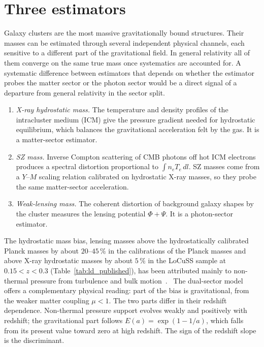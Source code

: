\section{Three estimators}\label{sec:tw_estimators}
Galaxy clusters are the most massive gravitationally bound structures. Their masses can be estimated through several independent physical channels,
each sensitive to a different part of the gravitational field. In general relativity all of them converge on the same true mass once systematics are
accounted for. A systematic difference between estimators that depends on whether the estimator probes the matter sector or the photon sector would be a
direct signal of a departure from general relativity in the sector split. \interp
\begin{enumerate}
\item \emph{X-ray hydrostatic mass.} The temperature and density profiles of the intracluster medium (ICM) give the pressure gradient needed for
hydrostatic equilibrium, which balances the gravitational acceleration felt by the gas. It is a matter-sector estimator.
\item \emph{SZ mass.} Inverse Compton scattering of CMB photons off hot ICM electrons produces a spectral distortion proportional to
$\int n_eT_e\,dl$. SZ masses come from a $Y$--$M$ scaling relation calibrated on hydrostatic X-ray masses, so they probe the same matter-sector
acceleration.
\item \emph{Weak-lensing mass.} The coherent distortion of background galaxy shapes by the cluster measures the lensing potential $\Phi+\Psi$. It is a
photon-sector estimator.
\end{enumerate}
The hydrostatic mass bias, lensing masses above the hydrostatically calibrated Planck masses by about $20$--$45\,\%$ in the
calibrations of the Planck masses and above X-ray hydrostatic masses by about $5\,\%$ in the LoCuSS sample at $0.15<z<0.3$ (Table~\ref{tab:ld_published}), has been attributed mainly to non-thermal pressure from turbulence and bulk
motion~\cite{Nagai2007Xray,Nelson2014}. \observed\ The dual-sector model offers a complementary physical reading: part of the bias is gravitational,
from the weaker matter coupling $\mu<1$. The two parts differ in their redshift dependence. Non-thermal pressure support evolves weakly and positively
with redshift; the gravitational part follows $E(a)=\exp(1-1/a)$, which falls from its present value toward zero at high redshift. The sign of the
redshift slope is the discriminant. \conjecture

